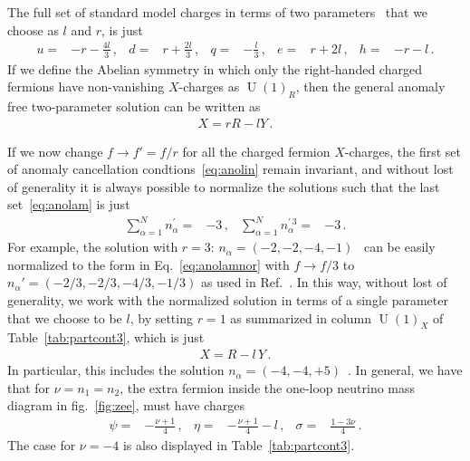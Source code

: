 \documentclass[12pt]{article}
\begin{document}
The full set of standard model charges in terms of two parameters~\cite{Appelquist:2002mw,Campos:2017dgc} that we choose as $l$ and $r$, is just
\begin{align}
  u=&-r-\frac{4l}{3}\,,&d=&r+\frac{2l}{3}\,,&q=&-\frac{l}{3}\,,&e=&r+2l\,,&h=&-r-l\,.
  \label{Eq:SMCharges}
\end{align}
If we define the Abelian symmetry in which only the right-handed charged fermions have non-vanishing $X$-charges as $\operatorname{U}(1)_R$, then the general anomaly free two-parameter solution can be written as
\begin{align}
  X=r R- l Y\,.
\end{align}


If we now change $f\to f'= f/r$ for all the charged fermion $X$-charges, the
first set of anomaly cancellation condtions~\eqref{eq:anolin} remain
invariant, and without lost of generality it is always possible to
normalize the solutions such that the last set~\eqref{eq:anolam} is
just
\begin{align}
  \label{eq:anolamnor}
   \sum_{\alpha=1}^{N} n_{\alpha}^{\prime}=&-3\,,   & \sum_{\alpha=1}^{N} n_{\alpha}^{\prime\, 3}=&-3\,.
\end{align}
For example, the solution with $r=3$: $n_{\alpha}=\left( -2,-2,-4,-1 \right)$~\cite{Appelquist:2002mw} can be easily normalized to the form in Eq.~\eqref{eq:anolamnor} with $f\to f/3$
to $n_{\alpha}'=\left( -2/3,-2/3,-4/3,-1/3 \right)$
as used in Ref.~\cite{Patra:2016ofq}. In this way, without lost of generality, we work with the normalized solution in terms of a single parameter~\cite{Jenkins:1987ue,Oda:2015gna,Okada:2018tgy} that we choose to be $l$, by setting $r=1$ as summarized in column $\operatorname{U}(1)_X$ of Table~\ref{tab:partcont3}, which is just
\begin{align}
  X=R-l\, Y\,.
\end{align}
In particular, this includes the solution  $n_{\alpha}=(-4,-4,+5)$~\cite{Appelquist:2002mw}. 
In general, we have that for $\nu=n_1=n_2$, the extra fermion inside the one-loop neutrino mass diagram in fig.~\ref{fig:zee}, must have charges
\begin{align}
  \psi=&-\frac{\nu+1}{4}\,,&\eta=&-\frac{\nu+1}{4}-l\,,&\sigma=&\frac{1-3\nu}{4}\,.
\end{align}
The case for $\nu=-4$ is also displayed in Table~\ref{tab:partcont3}.

%
%
%

%

\end{document}
